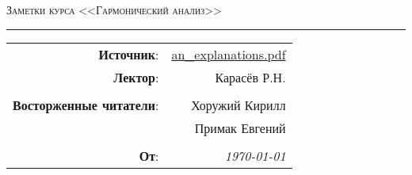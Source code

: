 
\begin{center}
    \LARGE \textsc{Заметки курса <<Гармонический анализ>>}
\end{center}

\hrule

\phantom{42}

\begin{flushright}
    \begin{tabular}{rr}
        \textbf{Источник}: 
        & \href{http://rkarasev.ru/common/upload/an_explanations.pdf}{an\_explanations.pdf} \\
        \textbf{Лектор}: 
        & Карасёв Р.Н. \\
        &\\
        \textbf{Восторженные читатели}: 
        & Хоружий Кирилл \\
        & Примак Евгений \\
        &\\
        \textbf{От}: &
        \textit{\today}\\
    \end{tabular}
\end{flushright}

\thispagestyle{empty}
\tableofcontents
\newpage
